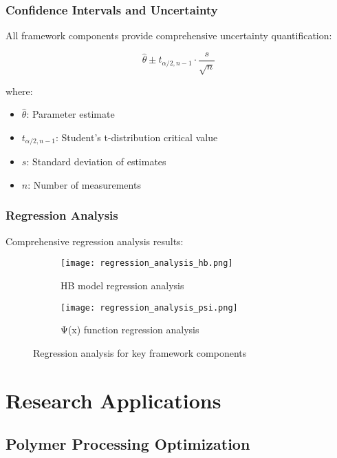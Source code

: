 \documentclass[11pt,a4paper]{article}
\begin{document}
\subsubsection{Confidence Intervals and Uncertainty}
\label{subsubsec:confidence_intervals}

All framework components provide comprehensive uncertainty quantification:

\begin{equation}
\hat{\theta} \pm t_{\alpha/2,n-1} \cdot \frac{s}{\sqrt{n}}
\label{eq:confidence_interval}
\end{equation}

where:
\begin{itemize}
    \item $\hat{\theta}$: Parameter estimate
    \item $t_{\alpha/2,n-1}$: Student's t-distribution critical value
    \item $s$: Standard deviation of estimates
    \item $n$: Number of measurements
\end{itemize}

\subsubsection{Regression Analysis}
\label{subsubsec:regression_analysis}

Comprehensive regression analysis results:

\begin{figure}[H]
\centering
\begin{subfigure}{0.45\textwidth}
    \texttt{[image: regression\_analysis\_hb.png]}
    \caption{HB model regression analysis}
    \label{fig:regression_hb}
\end{subfigure}
\hfill
\begin{subfigure}{0.45\textwidth}
    \texttt{[image: regression\_analysis\_psi.png]}
    \caption{Ψ(x) function regression analysis}
    \label{fig:regression_psi}
\end{subfigure}
\caption{Regression analysis for key framework components}
\label{fig:regression_analysis}
\end{figure}

\section{Research Applications}
\label{sec:applications}

\subsection{Polymer Processing Optimization}
\label{subsec:polymer_processing}
\end{document}
